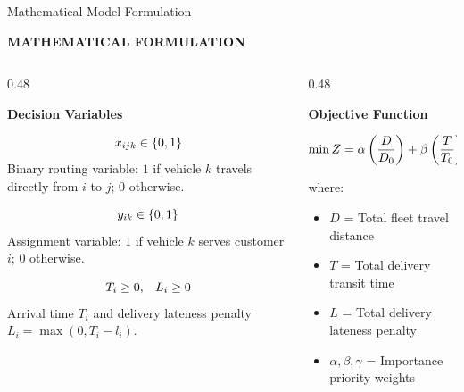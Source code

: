 \documentclass[aspectratio=169,10pt]{beamer}
\newcommand{\sectiontag}[1]{%
    {\scriptsize\bfseries\color{Accent}\MakeUppercase{#1}}\par\vspace{0.08cm}
}
\begin{document}
\begin{frame}{Mathematical Model Formulation}

\sectiontag{Mathematical Formulation}

\vspace{0.05cm}

\small

\begin{columns}[T,totalwidth=\textwidth]


\begin{column}{0.48\textwidth}

\textbf{\color{Primary}\small Decision Variables}

\vspace{0.05cm}

\[
\scriptsize
x_{ijk} \in \{0, 1\}
\]
\footnotesize
Binary routing variable: $1$ if vehicle $k$ travels directly from $i$ to $j$; $0$ otherwise.

\vspace{0.05cm}

\[
\scriptsize
y_{ik} \in \{0, 1\}
\]
\footnotesize
Assignment variable: $1$ if vehicle $k$ serves customer $i$; $0$ otherwise.

\vspace{0.05cm}

\[
\scriptsize
T_i \ge 0, \quad L_i \ge 0
\]
\footnotesize
Arrival time $T_i$ and delivery lateness penalty $L_i = \max(0, T_i - l_i)$.

\end{column}


\begin{column}{0.48\textwidth}

\textbf{\color{Primary}\small Objective Function}

\vspace{0.05cm}

\[
\scriptsize
\min Z = \alpha \left(\frac{D}{D_0}\right) + \beta \left(\frac{T}{T_0}\right) + \gamma \left(\frac{L}{L_0}\right)
\]

\vspace{-0.05cm}

\footnotesize
where:
\begin{itemize}
\setlength\itemsep{1pt}
\scriptsize
\item $D$ = Total fleet travel distance
\item $T$ = Total delivery transit time
\item $L$ = Total delivery lateness penalty
\item $\alpha,\beta,\gamma$ = Importance priority weights
\end{itemize}


\end{column}
\end{columns}
\end{frame}
\end{document}
